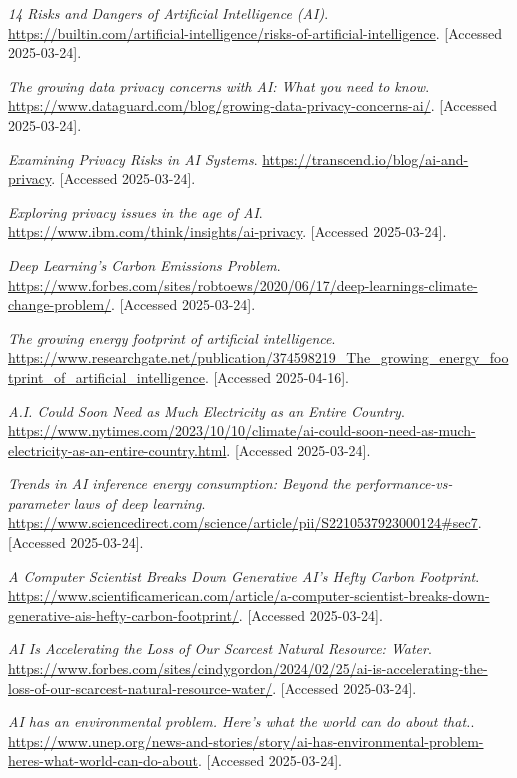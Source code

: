 \documentclass[licencjacka,en]{pracamgr}
\begin{document}
\begin{thebibliography}{99}
\textit{ 14 Risks and Dangers of Artificial Intelligence (AI)}.
\url{https://builtin.com/artificial-intelligence/risks-of-artificial-intelligence}.
[Accessed 2025-03-24].

\textit{The growing data privacy concerns with AI: What you need to know}.
\url{https://www.dataguard.com/blog/growing-data-privacy-concerns-ai/}.
[Accessed 2025-03-24].

\textit{Examining Privacy Risks in AI Systems}.
\url{https://transcend.io/blog/ai-and-privacy}.
[Accessed 2025-03-24].

\textit{Exploring privacy issues in the age of AI}.
\url{https://www.ibm.com/think/insights/ai-privacy}.
[Accessed 2025-03-24].


\textit{Deep Learning’s Carbon Emissions Problem}.
\url{https://www.forbes.com/sites/robtoews/2020/06/17/deep-learnings-climate-change-problem/}.
[Accessed 2025-03-24].

\textit{The growing energy footprint of artificial intelligence}.
\url{https://www.researchgate.net/publication/374598219_The_growing_energy_footprint_of_artificial_intelligence}.
[Accessed 2025-04-16].

\textit{A.I. Could Soon Need as Much Electricity as an Entire Country}.
\url{https://www.nytimes.com/2023/10/10/climate/ai-could-soon-need-as-much-electricity-as-an-entire-country.html}.
[Accessed 2025-03-24].

\textit{Trends in AI inference energy consumption: Beyond the performance-vs-parameter laws of deep learning}.
\url{https://www.sciencedirect.com/science/article/pii/S2210537923000124#sec7}.
[Accessed 2025-03-24].

\textit{A Computer Scientist Breaks Down Generative AI’s Hefty Carbon Footprint}.
\url{https://www.scientificamerican.com/article/a-computer-scientist-breaks-down-generative-ais-hefty-carbon-footprint/}.
[Accessed 2025-03-24].

\textit{AI Is Accelerating the Loss of Our Scarcest Natural Resource: Water}.
\url{https://www.forbes.com/sites/cindygordon/2024/02/25/ai-is-accelerating-the-loss-of-our-scarcest-natural-resource-water/}.
[Accessed 2025-03-24].

\textit{AI has an environmental problem. Here’s what the world can do about that.}.
\url{https://www.unep.org/news-and-stories/story/ai-has-environmental-problem-heres-what-world-can-do-about}.
[Accessed 2025-03-24].


\end{thebibliography}
\end{document}
